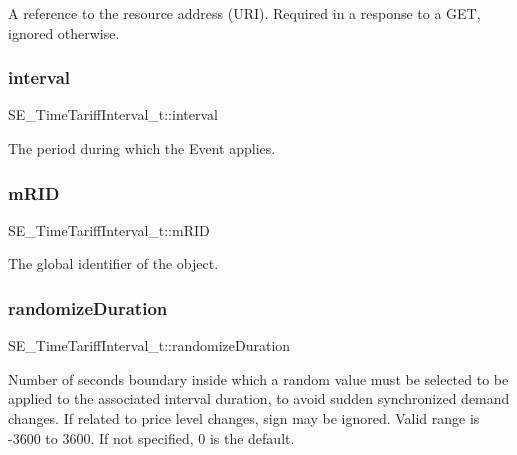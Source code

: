 A reference to the resource address (U\+RI). Required in a response to a G\+ET, ignored otherwise. \mbox{\label{group__TimeTariffInterval_gacacbb719e46c0307212fa42b1401b0bb}} 
\subsubsection{\texorpdfstring{interval}{interval}}
{\footnotesize\ttfamily S\+E\+\_\+\+Time\+Tariff\+Interval\+\_\+t\+::interval}

The period during which the Event applies. \mbox{\label{group__TimeTariffInterval_ga5dfc94691e8bcb18eeecf048476778ee}} 
\subsubsection{\texorpdfstring{m\+R\+ID}{mRID}}
{\footnotesize\ttfamily S\+E\+\_\+\+Time\+Tariff\+Interval\+\_\+t\+::m\+R\+ID}

The global identifier of the object. \mbox{\label{group__TimeTariffInterval_ga81fde071a84cf7021224cb01e53c8c75}} 
\subsubsection{\texorpdfstring{randomize\+Duration}{randomizeDuration}}
{\footnotesize\ttfamily S\+E\+\_\+\+Time\+Tariff\+Interval\+\_\+t\+::randomize\+Duration}

Number of seconds boundary inside which a random value must be selected to be applied to the associated interval duration, to avoid sudden synchronized demand changes. If related to price level changes, sign may be ignored. Valid range is -\/3600 to 3600. If not specified, 0 is the default. \mbox{\label{group__TimeTariffInterval_ga695517ae5552ce104273d78c0361a76f}} 
